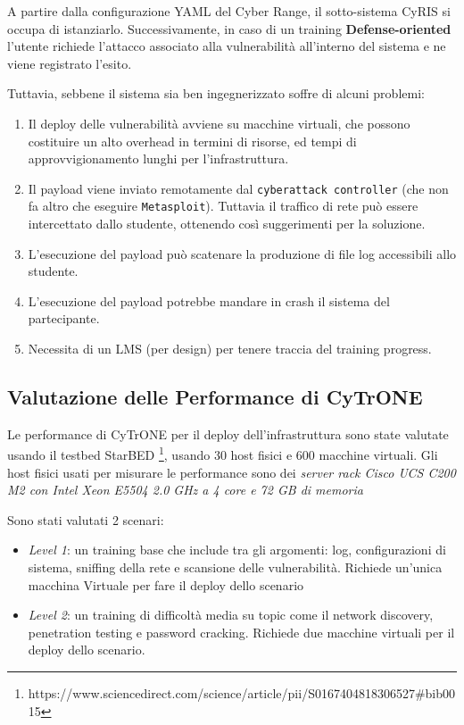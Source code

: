 A partire dalla configurazione YAML del Cyber Range, il sotto-sistema
CyRIS si occupa di istanziarlo. Successivamente, in caso di un training
\textbf{Defense-oriented} l'utente richiede l'attacco associato alla
vulnerabilità all'interno del sistema e ne viene registrato l'esito.

Tuttavia, sebbene il sistema sia ben ingegnerizzato soffre di alcuni
problemi:

\begin{enumerate}
\def\labelenumi{\arabic{enumi}.}
\tightlist
\item
  Il deploy delle vulnerabilità avviene su macchine virtuali, che
  possono costituire un alto overhead in termini di risorse, ed tempi di
  approvvigionamento lunghi per l'infrastruttura.
\item
  Il payload viene inviato remotamente dal
  \passthrough{\lstinline!cyberattack controller!} (che non fa altro che
  eseguire \passthrough{\lstinline!Metasploit!}). Tuttavia il traffico
  di rete può essere intercettato dallo studente, ottenendo così
  suggerimenti per la soluzione.
\item
  L'esecuzione del payload può scatenare la produzione di file log
  accessibili allo studente.
\item
  L'esecuzione del payload potrebbe mandare in crash il sistema del
  partecipante.
\item
  Necessita di un LMS (per design) per tenere traccia del training
  progress.
\end{enumerate}

\subsection{Valutazione delle Performance di
CyTrONE}\label{valutazione-delle-performance-di-cytrone}

Le performance di CyTrONE per il deploy dell'infrastruttura sono state
valutate usando il testbed StarBED \footnote{\label{fn:ref_10}https://www.sciencedirect.com/science/article/pii/S0167404818306527\#bib0015},
usando 30 host fisici e 600 macchine virtuali. Gli host fisici usati per
misurare le performance sono dei \emph{server rack Cisco UCS C200 M2 con
Intel Xeon E5504 2.0 GHz a 4 core e 72 GB di memoria}

Sono stati valutati 2 scenari:

\begin{itemize}
\tightlist
\item
  \emph{Level 1}: un training base che include tra gli argomenti: log,
  configurazioni di sistema, sniffing della rete e scansione delle
  vulnerabilità. Richiede un'unica macchina Virtuale per fare il deploy
  dello scenario
\item
  \emph{Level 2}: un training di difficoltà media su topic come il
  network discovery, penetration testing e password cracking. Richiede
  due macchine virtuali per il deploy dello scenario.
\end{itemize}

